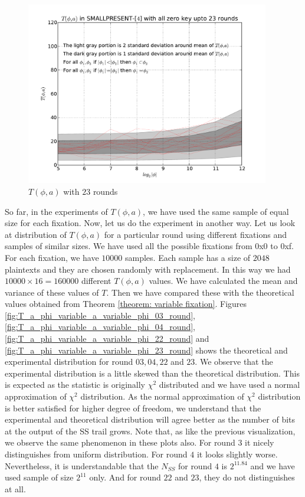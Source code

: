 \begin{figure}[h!]
    \centering
    \includegraphics[width=\textwidth , height = 8cm]{images/T_a_phi_variable_a_varible_phi_variable_size_23rounds}
    \caption{$T(\phi,a)$ with $23$ rounds}
    \label{fig:T_a_phi_variable_a_varible_phi_variable_size_23rounds}
\end{figure}%
\par \noindent So far, in the experiments of $T\left(\phi,a\right)$, we have used the same sample of equal size for each fixation. Now, let us do the experiment in another way. Let us look at distribution of $T\left(\phi,a\right)$ for a particular round using different fixations and samples of similar sizes. We have used all the possible fixations from 0x0 to 0xf. For each fixation, we have $10000$ samples. Each sample has a size of $2048$ plaintexts and they are chosen randomly with replacement. In this way we had $10000 \times 16 = 160000$ different $T\left(\phi,a\right)$ values. We have calculated the mean and variance of these values of $T$. Then we have compared these with the theoretical values obtained from Theorem \ref{theorem: variable fixation}. Figures \ref{fig:T_a_phi_variable_a_variable_phi_03_round},\ref{fig:T_a_phi_variable_a_variable_phi_04_round},\ref{fig:T_a_phi_variable_a_variable_phi_22_round} and \ref{fig:T_a_phi_variable_a_variable_phi_23_round} shows the theoretical and experimental distribution for round $03,04,22$ and $23$. We observe that the experimental distribution is a little skewed than the theoretical distribution. This is expected as the statistic is originally $\chi^2$ distributed and we have used a normal approximation of $\chi^2$ distribution. As the normal approximation of $\chi^2$ distribution is better satisfied for higher degree of freedom, we understand that the experimental and theoretical distribution will agree better as the number of bits at the output of the SS trail grows. Note that, as like the previous visualization, we observe the same phenomenon in these plots also. For round $3$ it nicely distinguishes from uniform distribution. For round $4$ it looks slightly worse. Nevertheless, it is understandable that the $N_{SS}$ for round $4$ is $2^{11.84}$ and we have used sample of size $2^{11}$ only. And for round $22$ and $23$, they do not distinguishes at all.
